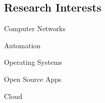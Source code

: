 \documentclass[../main.tex]{subfiles}
\begin{document}
\begin{category}
\section{Research Interests}
    \begin{enumerate*}[label=$\diamond$]
        \item Computer Networks \qquad \qquad 
        \item Automation \qquad \qquad
        \item Operating Systems \qquad \qquad 
        \item Open Source Apps  \qquad \qquad 
        \item Cloud
    \end{enumerate*}
\end{category}
\end{document}
